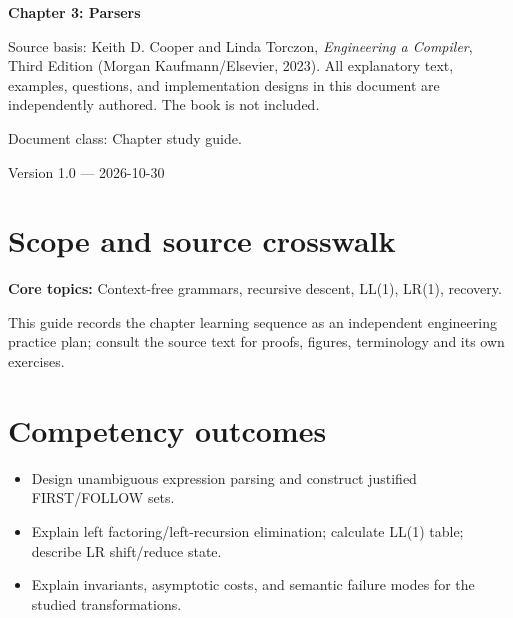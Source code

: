 \documentclass[10pt,letterpaper]{article}
\begin{document}
\begin{titlepage}
\centering\vspace*{1.0in}
{\Huge\bfseries\textcolor{CompilerBlue}{Chapter 3: Parsers}\par}
\vspace{.22in}{\Large Critical reading, original exercises, evidence and review\par}
\vspace{.4in}{\large Compiler Engineering Documentation Suite\par}
\vfill
\begin{minipage}{.86\linewidth}\small
Source basis: Keith D. Cooper and Linda Torczon, \emph{Engineering a Compiler}, Third Edition (Morgan Kaufmann/Elsevier, 2023). All explanatory text, examples, questions, and implementation designs in this document are independently authored. The book is not included.\par\medskip
Document class: Chapter study guide.
\end{minipage}
\vfill\textcolor{CompilerGray}{Version 1.0 --- 2026-10-30}\par
\end{titlepage}
\tableofcontents\clearpage
\section{Scope and source crosswalk}
\textbf{Core topics:} Context-free grammars, recursive descent, LL(1), LR(1), recovery.

This guide records the chapter learning sequence as an independent engineering practice plan; consult the source text for proofs, figures, terminology and its own exercises.

\section{Competency outcomes}
\begin{itemize}
\item Design unambiguous expression parsing and construct justified FIRST/FOLLOW sets.
\item Explain left factoring/left-recursion elimination; calculate LL(1) table; describe LR shift/reduce state.
\item Explain invariants, asymptotic costs, and semantic failure modes for the studied transformations.
\end{itemize}
\end{document}

